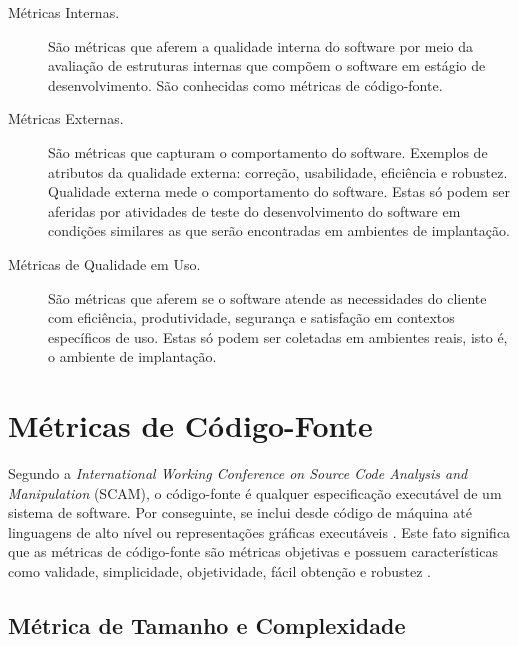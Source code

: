 \begin{description}
		\item[Métricas Internas.] 
		São métricas que aferem a qualidade interna do software por meio da 
		avaliação de estruturas internas que compõem o software em estágio de 
		desenvolvimento. São conhecidas como métricas de código-fonte.

		\item[Métricas Externas.]
		São métricas que capturam o comportamento do software. Exemplos de 
		atributos da qualidade externa: correção, usabilidade, eficiência e 
		robustez. Qualidade externa mede o comportamento do software. Estas só 
		podem ser aferidas por atividades de teste do desenvolvimento do 
		software em condições similares as que serão encontradas em ambientes de
		implantação.

		\item[Métricas de Qualidade em Uso.]
		 São métricas que aferem se o software atende as necessidades do cliente
		 com eficiência, produtividade, segurança e satisfação em contextos 
		 específicos de uso. Estas só podem ser coletadas em ambientes reais, 
		 isto é, o ambiente de implantação.	
			 
\end{description}
		
				

\section {Métricas de Código-Fonte}
\label{Métricas de Código-Fonte}

Segundo a \textit{International Working Conference on Source Code Analysis and 
Manipulation} (SCAM), o código-fonte é qualquer especificação executável 
de um sistema de software. Por conseguinte, se inclui desde código de máquina 
até linguagens de alto nível ou representações gráficas executáveis \cite{harman2010source}. Este fato significa que as métricas de código-fonte  são métricas objetivas e possuem características como validade, simplicidade, objetividade, fácil obtenção e robustez \cite{Mills:1999}. 


\subsection{Métrica de Tamanho e Complexidade}

